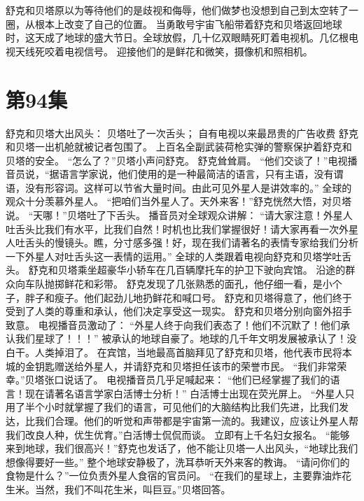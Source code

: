 \documentclass[a4paper,12pt,UTF8,twoside]{ctexbook}
\begin{document}
        舒克和贝塔原以为等待他们的是歧视和侮辱，他们做梦也没想到自己到太空转了一圈，从根本上改变了自己的位置。 
        当勇敢号宇宙飞船带着舒克和贝塔返回地球时，这天成了地球的盛大节日。全球放假，几十亿双眼睛死盯着电视机。几亿根电视天线死咬着电视信号。 
        迎接他们的是鲜花和微笑，摄像机和照相机。   \chapter{第94集} 
        舒克和贝塔大出风头： 
        贝塔吐了一次舌头； 
        自有电视以来最昂贵的广告收费   
        舒克和贝塔一出机舱就被记者包围了。 
        上百名全副武装荷枪实弹的警察保护着舒克和贝塔的安全。 
        “怎么了？”贝塔小声问舒克。 
        舒克耸耸肩。 
        “他们交谈了！”电视播音员说，“据语言学家说，他们使用的是一种最简洁的语言，只有主语，没有谓语，没有形容词。这样可以节省大量时间。由此可见外星人是讲效率的。” 
        全球的观众十分羡慕外星人。 
        “把咱们当外星人了。天外来客！”舒克恍然大悟，对贝塔说。 
        “天哪！”贝塔吐了下舌头。 
        播音员对全球观众讲解：  “请大家注意！外星人吐舌头比我们有水平，比我们自然！时机也比我们掌握很好！请大家再看一次外星人吐舌头的慢镜头。瞧，分寸感多强！好，现在我们请著名的表情专家给我们分析一下外星人对吐舌头这一表情的运用。” 
        全球的人类跟着电视向舒克和贝塔学吐舌头。 
        舒克和贝塔乘坐超豪华小轿车在几百辆摩托车的护卫下驶向宾馆。 
        沿途的群众向车队抛掷鲜花和彩带。 
        舒克发现了几张熟悉的面孔，他仔细一看，是小个子，胖子和瘦子。他们起劲儿地扔鲜花和喊口号。 
        舒克和贝塔得意了，他们终于受到了人类的尊重和承认，他们决定享受这一现实。 
        舒克和贝塔分别向窗外招手致意。 
        电视播音员激动了： 
        “外星人终于向我们表态了！他们不沉默了！他们承认我们星球了！！！” 
        被承认的地球自豪了。地球的几千年文明发展被承认了！没白干。人类掉泪了。 
        在宾馆，当地最高首脑拜见了舒克和贝塔，他代表市民将本城的金钥匙赠送给外星人，并请舒克和贝塔担任该市的荣誉市民。 
        “我们非常荣幸。”贝塔张口说话了。 
        电视播音员几乎足喊起来： 
        “他们已经掌握了我们的语言！现在请著名语言学家白活博士分析！” 
        白活博士出现在荧光屏上。 
        “外星人只用了半个小时就掌握了我们的语言，可见他们的大脑结构比我们先进，比我们发达，比我们合理。他们的听觉和声带都是宇宙第一流的。我建议，应该让外星人帮我们改良人种，优生优育。”白活博士侃侃而谈。 
        立即有上千名妇女报名。 
        “能够来到地球，我们很高兴！”舒克也发话了，他不能让贝塔一人出风头，“地球比我们想像得要好一些。” 
        整个地球安静极了，洗耳恭听天外来客的教诲。 
        “请问你们的食物是什么？”一位负责外星人食宿的官员问。 
        “在我们的星球上，主要靠油炸花生米。当然，我们不叫花生米，叫巨豆。”贝塔回答。 
\end{document}
